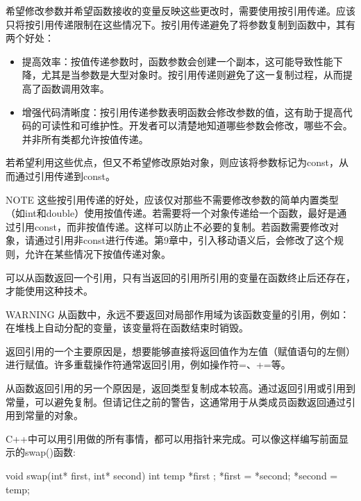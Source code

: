 
希望修改参数并希望函数接收的变量反映这些更改时，需要使用按引用传递。应该只将按引用传递限制在这些情况下。按引用传递避免了将参数复制到函数中，其有两个好处：

\begin{itemize}
\item
提高效率：按值传递参数时，函数参数会创建一个副本，这可能导致性能下降，尤其是当参数是大型对象时。按引用传递则避免了这一复制过程，从而提高了函数调用效率。

\item
增强代码清晰度：按引用传递参数表明函数会修改参数的值，这有助于提高代码的可读性和可维护性。开发者可以清楚地知道哪些参数会修改，哪些不会。并非所有类都允许按值传递。
\end{itemize}

若希望利用这些优点，但又不希望修改原始对象，则应该将参数标记为const，从而通过引用传递到const。

\begin{myNotic}{NOTE}
这些按引用传递的好处，应该仅对那些不需要修改参数的简单内置类型（如int和double）使用按值传递。若需要将一个对象传递给一个函数，最好是通过引用const，而非按值传递。这样可以防止不必要的复制。若函数需要修改对象，请通过引用非const进行传递。第9章中，引入移动语义后，会修改了这个规则，允许在某些情况下按值传递对象。
\end{myNotic}


可以从函数返回一个引用，只有当返回的引用所引用的变量在函数终止后还存在，才能使用这种技术。

\begin{myWarning}{WARNING}
从函数中，永远不要返回对局部作用域为该函数变量的引用，例如：在堆栈上自动分配的变量，该变量将在函数结束时销毁。
\end{myWarning}

返回引用的一个主要原因是，想要能够直接将返回值作为左值（赋值语句的左侧）进行赋值。许多重载操作符通常返回引用，例如操作符=、+=等。

从函数返回引用的另一个原因是，返回类型复制成本较高。通过返回引用或引用到常量，可以避免复制。但请记住之前的警告，这通常用于从类成员函数返回通过引用到常量的对象。


C++中可以用引用做的所有事情，都可以用指针来完成。可以像这样编写前面显示的swap()函数:

\begin{cpp}
void swap(int* first, int* second)
{
    int temp { *first };
    *first = *second;
    *second = temp;
}
\end{cpp}

